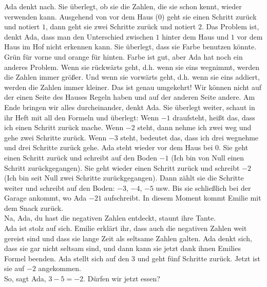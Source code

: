 Ada denkt nach. 
Sie überlegt, ob sie die Zahlen, die sie schon kennt, wieder verwenden kann. Ausgehend von vor dem Haus ($0$) geht sie einen Schritt zurück und notiert $1$, dann geht sie zwei Schritte zurück und notiert $2$. 
Das Problem ist, denkt Ada, dass man den Unterschied zwischen $1$ hinter dem Haus und $1$ vor dem Haus im Hof nicht erkennen kann. 
Sie überlegt, dass sie Farbe benutzen könnte. 
Grün für vorne und orange für hinten. 
Farbe ist gut, aber Ada hat noch ein anderes Problem. 
Wenn sie rückwärts geht, d.h. wenn sie eins wegnimmt, werden die Zahlen immer größer. Und wenn sie vorwärts geht, d.h. wenn sie eins addiert, werden die Zahlen immer kleiner.
Das ist genau umgekehrt! Wir können nicht auf der einen Seite des Hauses Regeln haben und auf der anderen Seite andere. 
Am Ende bringen wir alles durcheinander, denkt Ada. 
Sie überlegt weiter, schaut in ihr Heft mit all den Formeln und überlegt: Wenn $-1$ draufsteht, heißt das, dass ich einen Schritt zurück mache. Wenn $-2$ steht, dann nehme ich zwei weg und gehe zwei Schritte zurück. Wenn $-3$ steht, bedeutet das, dass ich drei wegnehme und drei Schritte zurück gehe. 
Ada steht wieder vor dem Haus bei $0$. Sie geht einen Schritt zurück und schreibt auf den Boden $-1$ (Ich bin von Null einen Schritt zurückgegangen). Sie geht wieder einen Schritt zurück und schreibt $-2$ (Ich bin seit Null zwei Schritte zurückgegangen). Dann zählt sie die Schritte weiter und schreibt auf den Boden: $-3$, $-4$, $-5$ usw. 
Bis sie schließlich bei der Garage ankommt, wo Ada $-21$ aufschreibt. 
In diesem Moment kommt Emilie mit dem Snack zurück.\\
\frqq{}Na, Ada, du hast die negativen Zahlen entdeckt\flqq{}, staunt ihre Tante.\\
Ada ist stolz auf sich. Emilie erklärt ihr, dass auch die negativen Zahlen weit gereist sind und dass sie lange Zeit als seltsame Zahlen galten. Ada denkt sich, dass sie gar nicht seltsam sind, und dann kann sie jetzt dank ihnen Emilies Formel beenden. Ada stellt sich auf den $3$ und geht fünf Schritte zurück. Jetzt ist sie auf $-2$ angekommen.\\
\frqq{}So\flqq{}, sagt Ada, \frqq{}$3 - 5 = -2$. Dürfen wir jetzt essen?\flqq{}

%    
